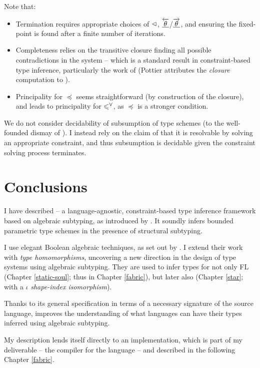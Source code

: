Note that: \begin{itemize}
    \item Termination requires appropriate choices of $\lhd$, $\underline{\overleftarrow{\theta}}$/$\underline{\overrightarrow{\theta}}$, and ensuring the fixed-point is found after a finite number of iterations.
    \item Completeness relies on the transitive closure finding all possible contradictions in the system -- which is a standard result in constraint-based type inference, particularly the work of \textcite{pottier-framework} (Pottier attributes the \emph{closure} computation to \textcite{closure-in-type-inference}).
    \item Principality for $\preceq$ seems straightforward (by construction of the closure), and leads to principality for $\leqslant^\forall$, as $\preceq$ is a stronger condition.
\end{itemize}
We do not consider decidability of subsumption of type schemes (to the well-founded dismay of \textcite{dolan-thesis}). I instead rely on the claim of \textcite{mlstruct} that it is resolvable by solving an appropriate constraint, and thus subsumption is decidable given the constraint solving process terminates.

\section{Conclusions}
\label{sec:conclusions}

I have described \inference{} -- a language-agnostic, constraint-based type inference framework based on algebraic subtyping, as introduced by \textcite{mlsub}.
It soundly infers bounded parametric type schemes in the presence of structural subtyping. 

I use elegant Boolean algebraic techniques, as set out by \textcite{mlstruct}. I extend their work with \emph{type homomorphisms}, uncovering a new direction in the design of type systems using algebraic subtyping. They are used to infer types for not only FL (Chapter \ref{static-soul}; thus \fabric{} in Chapter \ref{fabric}), but later also \starr{} (Chapter \ref{star}; with a $\iota$ \emph{shape-index isomorphism}).

Thanks to its general specification in terms of a necessary signature of the source language, \inference{} improves the understanding of what languages can have their types inferred using algebraic subtyping.

My description lends itself directly to an implementation, which is part of my deliverable -- the \compiler{} compiler for the \fabric{} language -- and described in the following Chapter \ref{fabric}.
